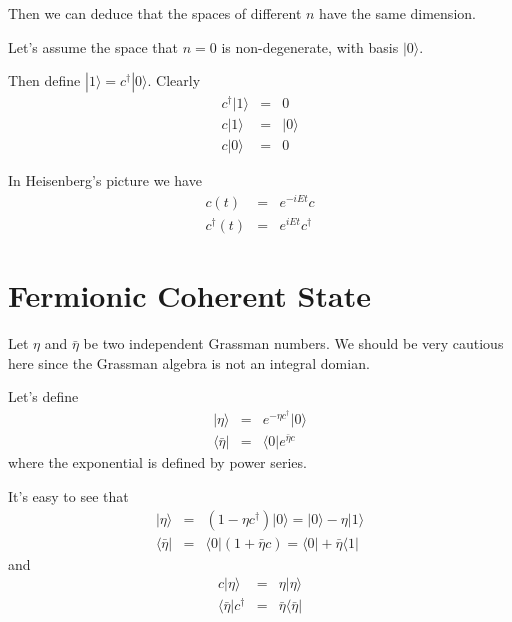 \documentclass[12pt]{book}
\begin{document}
	Then we can deduce that the spaces of different $n$ have the same dimension.
	
	Let's assume the space that $n=0$ is non-degenerate, with basis $|0\rangle$.
	
	Then define $|1\rangle=c^\dagger|0\rangle$. Clearly
	\begin{eqnarray}
		c^\dagger|1\rangle&=&0\\
		c|1\rangle&=&|0\rangle\\
		c|0\rangle&=&0
	\end{eqnarray}
	
	In Heisenberg's picture we have
	\begin{eqnarray}
		c(t)&=&e^{-iE t}c\\
		c^\dagger(t)&=&e^{iE t}c^\dagger
	\end{eqnarray}
	
\section{Fermionic Coherent State}

	Let $\eta$ and $\bar\eta$ be two independent Grassman numbers. We should be very cautious here since the Grassman algebra is not an integral domian.
	
	Let's define
	\begin{eqnarray}
		|\eta\rangle&=&e^{-\eta c^\dagger}|0\rangle\\
		\langle \bar\eta|&=&\langle 0|e^{\bar\eta c}
	\end{eqnarray}
	where the exponential is defined by power series.
	
	It's easy to see that 
	\begin{eqnarray}
		|\eta\rangle&=&(1-\eta c^\dagger)|0\rangle=|0\rangle-\eta|1\rangle\\
		\langle \bar\eta|&=&\langle 0|(1+\bar\eta c)=\langle 0|+\bar\eta\langle 1|
	\end{eqnarray}
	and
	\begin{eqnarray}
		c|\eta\rangle&=&\eta|\eta\rangle\\
		\langle \bar\eta|c^\dagger&=&\bar\eta\langle \bar\eta|
	\end{eqnarray}
	
\end{document}
